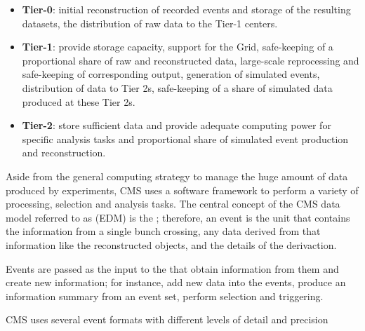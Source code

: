 \begin{itemize}
\item \textbf{Tier-0}: initial reconstruction of recorded events and storage of the resulting datasets, the distribution of raw data to the Tier-1 centers.
\item \textbf{Tier-1}: provide storage capacity, support for the Grid, safe-keeping of a proportional share of raw and reconstructed data, large-scale reprocessing and safe-keeping of corresponding output, generation of simulated events, distribution of data to Tier 2s, safe-keeping of a share of simulated data produced at these Tier 2s.
\item \textbf{Tier-2}: store sufficient data and provide adequate computing power for specific analysis tasks and proportional share of simulated event production and reconstruction.
\end{itemize}

Aside from the general computing strategy to manage the huge amount of data produced by experiments, CMS uses a software framework to perform a variety of processing, selection and analysis tasks. The central concept of the CMS data model referred to as  (EDM) is the ; therefore, an event is the unit that contains the information from a single bunch crossing, any data derived from that information like the reconstructed objects, and the details of the derivaction.

Events are passed as the input to the  that obtain information from them and create new information; for instance,  add new data into the events,  produce an information summary from an event set,  perform selection and triggering.

CMS uses several event formats with different levels of detail and precision

